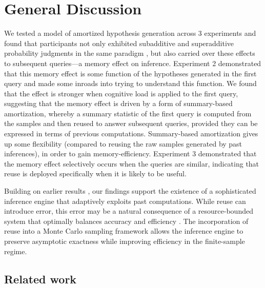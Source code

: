 \section{General Discussion}

We tested a model of amortized hypothesis generation across 3 experiments and found that participants not only exhibited subadditive and superadditive probability judgments in the same paradigm \citep[replicating][]{dasgupta17}, but also carried over these effects to subsequent queries---a memory effect on inference. Experiment 2 demonstrated that this memory effect is some function of the hypotheses generated in the first query and made some inroads into trying to understand this function. We found that the effect is stronger when cognitive load is applied to the first query, suggesting that the memory effect is driven by a form of summary-based amortization, whereby a summary statistic of the first query is computed from the samples and then reused to answer subsequent queries, provided they can be expressed in terms of previous computations. Summary-based amortization gives up some flexibility (compared to reusing the raw samples generated by past inferences), in order to gain memory-efficiency. Experiment 3 demonstrated that the memory effect selectively occurs when the queries are similar, indicating that reuse is deployed specifically when it is likely to be useful.

Building on earlier results \citep{gershman2014amortized}, our findings support the existence of a sophisticated inference engine that adaptively exploits past computations. While reuse can introduce error, this error may be a natural consequence of a resource-bounded system that optimally balances accuracy and efficiency \citep{lieder2012burn,vul2014one,griffiths2015,gershman2015computational}. The incorporation of reuse into a Monte Carlo sampling framework allows the inference engine to preserve asymptotic exactness while improving efficiency in the finite-sample regime.

\subsection{Related work}


